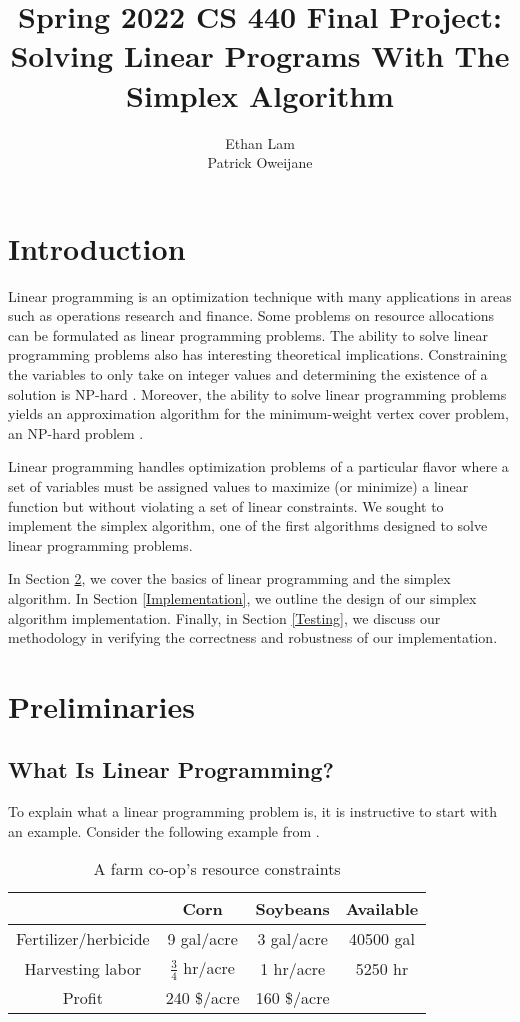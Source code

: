\documentclass{article}
\title{Spring 2022 CS 440 Final Project: Solving Linear Programs With The Simplex Algorithm}
\author{Ethan Lam \\ Patrick Oweijane}
\date{}
\begin{document}
\maketitle

\section{Introduction}
Linear programming is an optimization technique with many applications in areas such as operations research and finance. Some problems on resource allocations can be formulated as linear programming problems. The ability to solve linear programming problems also has interesting theoretical implications. Constraining the variables to only take on integer values and determining the existence of a solution is NP-hard \cite{CLRS}. Moreover, the ability to solve linear programming problems yields an approximation algorithm for the minimum-weight vertex cover problem, an NP-hard problem \cite{CLRS}.

Linear programming handles optimization problems of a particular flavor where a set of variables must be assigned values to maximize (or minimize) a linear function but without violating a set of linear constraints. We sought to implement the simplex algorithm, one of the first algorithms designed to solve linear programming problems. 

In Section \ref{Preliminaries}, we cover the basics of linear programming and the simplex algorithm. In Section \ref{Implementation}, we outline the design of our simplex algorithm implementation. Finally, in Section \ref{Testing}, we discuss our methodology in verifying the correctness and robustness of our implementation.

\section{Preliminaries} \label{Preliminaries}
\subsection{What Is Linear Programming?}
To explain what a linear programming problem is, it is instructive to start with an example. Consider the following example from \cite{finitebook}.

\begin{table}[h!]
    \centering
    \begin{tabular}{|c|c|c|c|}
        \hline
        & \textbf{Corn} & \textbf{Soybeans} & \textbf{Available} \\
        \hline
        Fertilizer/herbicide & 9 gal/acre & 3 gal/acre & 40500 gal \\
        Harvesting labor & $\frac{3}{4}$ hr/acre & 1 hr/acre & 5250 hr \\
        \hline
        Profit & 240 \$/acre & 160 \$/acre & \\ 
        \hline
    \end{tabular}
    \caption{A farm co-op's resource constraints}
    \label{lin-prog-ex-table}
\end{table}
\end{document}
